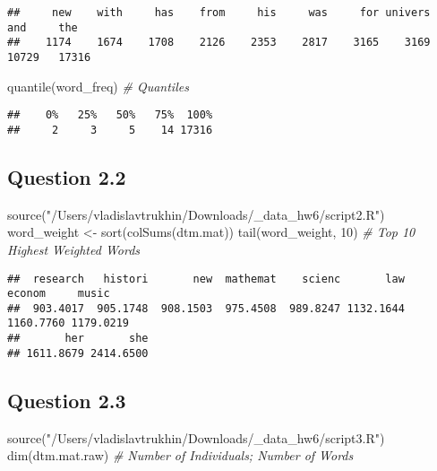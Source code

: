 \documentclass[
]{article}
\newenvironment{Shaded}{\begin{snugshade}}{\end{snugshade}}
\newcommand{\CommentTok}[1]{\textcolor[rgb]{0.56,0.35,0.01}{\textit{#1}}}
\newcommand{\DecValTok}[1]{\textcolor[rgb]{0.00,0.00,0.81}{#1}}
\newcommand{\FunctionTok}[1]{\textcolor[rgb]{0.00,0.00,0.00}{#1}}
\newcommand{\NormalTok}[1]{#1}
\newcommand{\OtherTok}[1]{\textcolor[rgb]{0.56,0.35,0.01}{#1}}
\newcommand{\StringTok}[1]{\textcolor[rgb]{0.31,0.60,0.02}{#1}}
\begin{document}
\begin{verbatim}
##     new    with     has    from     his     was     for univers     and     the 
##    1174    1674    1708    2126    2353    2817    3165    3169   10729   17316
\end{verbatim}

\begin{Shaded}
\begin{Highlighting}[]
\FunctionTok{quantile}\NormalTok{(word\_freq) }\CommentTok{\# Quantiles}
\end{Highlighting}
\end{Shaded}

\begin{verbatim}
##    0%   25%   50%   75%  100% 
##     2     3     5    14 17316
\end{verbatim}

\hypertarget{question-2.2}{%
\subsection{Question 2.2}\label{question-2.2}}

\begin{Shaded}
\begin{Highlighting}[]
\FunctionTok{source}\NormalTok{(}\StringTok{"/Users/vladislavtrukhin/Downloads/\_data\_hw6/script2.R"}\NormalTok{)}
\NormalTok{word\_weight }\OtherTok{\textless{}{-}} \FunctionTok{sort}\NormalTok{(}\FunctionTok{colSums}\NormalTok{(dtm.mat))}
\FunctionTok{tail}\NormalTok{(word\_weight, }\DecValTok{10}\NormalTok{) }\CommentTok{\# Top 10 Highest Weighted Words}
\end{Highlighting}
\end{Shaded}

\begin{verbatim}
##  research   histori       new  mathemat    scienc       law    econom     music 
##  903.4017  905.1748  908.1503  975.4508  989.8247 1132.1644 1160.7760 1179.0219 
##       her       she 
## 1611.8679 2414.6500
\end{verbatim}

\hypertarget{question-2.3}{%
\subsection{Question 2.3}\label{question-2.3}}

\begin{Shaded}
\begin{Highlighting}[]
\FunctionTok{source}\NormalTok{(}\StringTok{"/Users/vladislavtrukhin/Downloads/\_data\_hw6/script3.R"}\NormalTok{)}
\FunctionTok{dim}\NormalTok{(dtm.mat.raw) }\CommentTok{\# Number of Individuals; Number of Words}
\end{Highlighting}
\end{Shaded}
\end{document}
